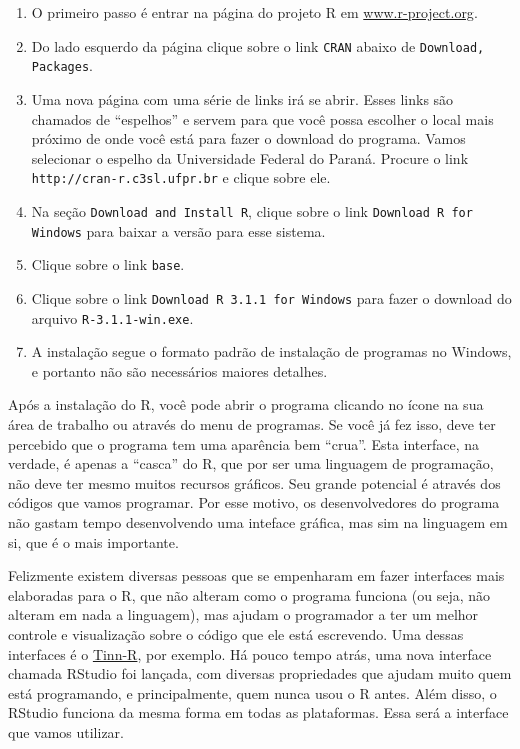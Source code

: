 \documentclass[a4paper,12pt]{article}\usepackage[]{graphicx}\usepackage[]{color}
\providecommand{\R}{\textsf{R}\xspace}
\providecommand{\RStudio}{\textsf{RStudio}\xspace}
\begin{document}
\begin{enumerate}
\item O primeiro passo é entrar na página do projeto \R em
\url{www.r-project.org}.
\item Do lado esquerdo da página clique sobre o link \texttt{CRAN}
  abaixo de \texttt{Download, Packages}.
\item Uma nova página com uma série de links irá se abrir. Esses links
  são chamados de ``espelhos'' e servem para que você possa escolher o
  local mais próximo de onde você está para fazer o download do
  programa. Vamos selecionar o espelho da Universidade Federal do
  Paraná. Procure o link \texttt{http://cran-r.c3sl.ufpr.br} e clique sobre
  ele.
\item Na seção \texttt{Download and Install R}, clique sobre o link
  \texttt{Download R for Windows} para baixar a versão para esse
  sistema.
\item Clique sobre o link \texttt{base}.
\item Clique sobre o link \texttt{Download R 3.1.1 for Windows} para
  fazer o download do arquivo \texttt{R-3.1.1-win.exe}.
\item A instalação segue o formato padrão de instalação de programas no
  Windows, e portanto não são necessários maiores detalhes.
\end{enumerate}

Após a instalação do \R, você pode abrir o programa clicando no ícone na
sua área de trabalho ou através do menu de programas. Se você já fez
isso, deve ter percebido que o programa tem uma aparência bem
``crua''. Esta interface, na verdade, é apenas a ``casca'' do \R, que
por ser uma linguagem de programação, não deve ter mesmo muitos recursos
gráficos. Seu grande potencial é através dos códigos que vamos
programar. Por esse motivo, os desenvolvedores do programa não gastam
tempo desenvolvendo uma inteface gráfica, mas sim na linguagem em si,
que é o mais importante.

Felizmente existem diversas pessoas que se empenharam em fazer
interfaces mais elaboradas para o \R, que não alteram como o programa
funciona (ou seja, não alteram em nada a linguagem), mas ajudam o
programador a ter um melhor controle e visualização sobre o código que
ele está escrevendo. Uma dessas interfaces é o
\href{http://www.sciviews.org/Tinn-R}{Tinn-R}, por exemplo. Há pouco
tempo atrás, uma nova interface chamada \RStudio foi lançada, com
diversas propriedades que ajudam muito quem está programando, e
principalmente, quem nunca usou o \R antes. Além disso, o \RStudio
funciona da mesma forma em todas as plataformas. Essa será a interface
que vamos utilizar.
\end{document}
